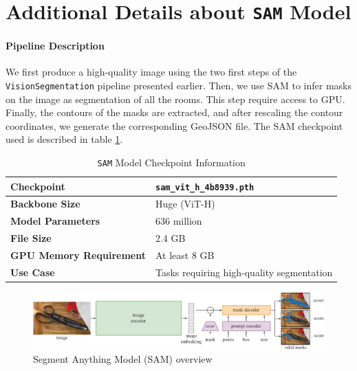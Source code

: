 \documentclass[11pt]{article}
\begin{document}

\section{Additional Details about \texttt{SAM} Model}
\label{app:sec:SAMdetails}

\paragraph{Pipeline Description} 
We first produce a high-quality image using the 
two first steps of the \texttt{VisionSegmentation} pipeline presented earlier.
Then, we use SAM to infer masks on 
the image as segmentation of all the rooms. This step require access to GPU.
Finally, the contours of the masks 
are extracted, and after rescaling the contour coordinates, we generate the 
corresponding GeoJSON file. The SAM checkpoint used is described in table
\ref{tab:SAM_model_checkpoint}.

\begin{table}[htb!]
    \centering
    \begin{tabular}{|l|l|}
        \hline
        \textbf{Checkpoint} & \texttt{sam\_vit\_h\_4b8939.pth} \\ \hline
        \textbf{Backbone Size} & Huge (ViT-H) \\ \hline
        \textbf{Model Parameters} & 636 million \\ \hline
        \textbf{File Size} & 2.4 GB \\ \hline
        \textbf{GPU Memory Requirement} & At least 8 GB \\ \hline
        \textbf{Use Case} & Tasks requiring high-quality segmentation \\ \hline
    \end{tabular}
    \caption{\texttt{SAM} Model Checkpoint Information}
    \label{tab:SAM_model_checkpoint}
\end{table}


\begin{figure}[htb!]
    \centering
    \includegraphics[width=0.9\linewidth]{figures/SAM_model_diagram.pdf}
    \caption{Segment Anything Model (SAM) overview}
    \label{fig:SAMmodel_diagram}
\end{figure}
\end{document}
